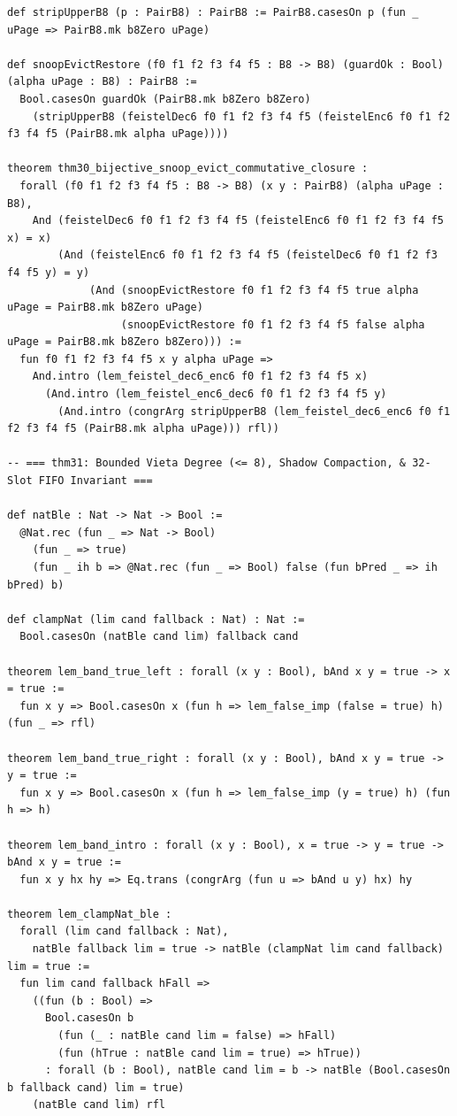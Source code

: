 \documentclass[10pt,twocolumn]{article}
\theoremstyle{spectralthm}
\begin{document}
\begin{lstlisting}[language=Lean4,caption={Standalone Pure Init.Prelude Term-Mode Lean 4 Expansion (thm30--thm37, v1.1.0, 0 sorry, 0 axioms).},label={lst:lean_v110}]
def stripUpperB8 (p : PairB8) : PairB8 := PairB8.casesOn p (fun _ uPage => PairB8.mk b8Zero uPage)

def snoopEvictRestore (f0 f1 f2 f3 f4 f5 : B8 -> B8) (guardOk : Bool) (alpha uPage : B8) : PairB8 :=
  Bool.casesOn guardOk (PairB8.mk b8Zero b8Zero)
    (stripUpperB8 (feistelDec6 f0 f1 f2 f3 f4 f5 (feistelEnc6 f0 f1 f2 f3 f4 f5 (PairB8.mk alpha uPage))))

theorem thm30_bijective_snoop_evict_commutative_closure :
  forall (f0 f1 f2 f3 f4 f5 : B8 -> B8) (x y : PairB8) (alpha uPage : B8),
    And (feistelDec6 f0 f1 f2 f3 f4 f5 (feistelEnc6 f0 f1 f2 f3 f4 f5 x) = x)
        (And (feistelEnc6 f0 f1 f2 f3 f4 f5 (feistelDec6 f0 f1 f2 f3 f4 f5 y) = y)
             (And (snoopEvictRestore f0 f1 f2 f3 f4 f5 true alpha uPage = PairB8.mk b8Zero uPage)
                  (snoopEvictRestore f0 f1 f2 f3 f4 f5 false alpha uPage = PairB8.mk b8Zero b8Zero))) :=
  fun f0 f1 f2 f3 f4 f5 x y alpha uPage =>
    And.intro (lem_feistel_dec6_enc6 f0 f1 f2 f3 f4 f5 x)
      (And.intro (lem_feistel_enc6_dec6 f0 f1 f2 f3 f4 f5 y)
        (And.intro (congrArg stripUpperB8 (lem_feistel_dec6_enc6 f0 f1 f2 f3 f4 f5 (PairB8.mk alpha uPage))) rfl))

-- === thm31: Bounded Vieta Degree (<= 8), Shadow Compaction, & 32-Slot FIFO Invariant ===

def natBle : Nat -> Nat -> Bool :=
  @Nat.rec (fun _ => Nat -> Bool)
    (fun _ => true)
    (fun _ ih b => @Nat.rec (fun _ => Bool) false (fun bPred _ => ih bPred) b)

def clampNat (lim cand fallback : Nat) : Nat :=
  Bool.casesOn (natBle cand lim) fallback cand

theorem lem_band_true_left : forall (x y : Bool), bAnd x y = true -> x = true :=
  fun x y => Bool.casesOn x (fun h => lem_false_imp (false = true) h) (fun _ => rfl)

theorem lem_band_true_right : forall (x y : Bool), bAnd x y = true -> y = true :=
  fun x y => Bool.casesOn x (fun h => lem_false_imp (y = true) h) (fun h => h)

theorem lem_band_intro : forall (x y : Bool), x = true -> y = true -> bAnd x y = true :=
  fun x y hx hy => Eq.trans (congrArg (fun u => bAnd u y) hx) hy

theorem lem_clampNat_ble :
  forall (lim cand fallback : Nat),
    natBle fallback lim = true -> natBle (clampNat lim cand fallback) lim = true :=
  fun lim cand fallback hFall =>
    ((fun (b : Bool) =>
      Bool.casesOn b
        (fun (_ : natBle cand lim = false) => hFall)
        (fun (hTrue : natBle cand lim = true) => hTrue))
      : forall (b : Bool), natBle cand lim = b -> natBle (Bool.casesOn b fallback cand) lim = true)
    (natBle cand lim) rfl


\end{lstlisting}
\end{document}
